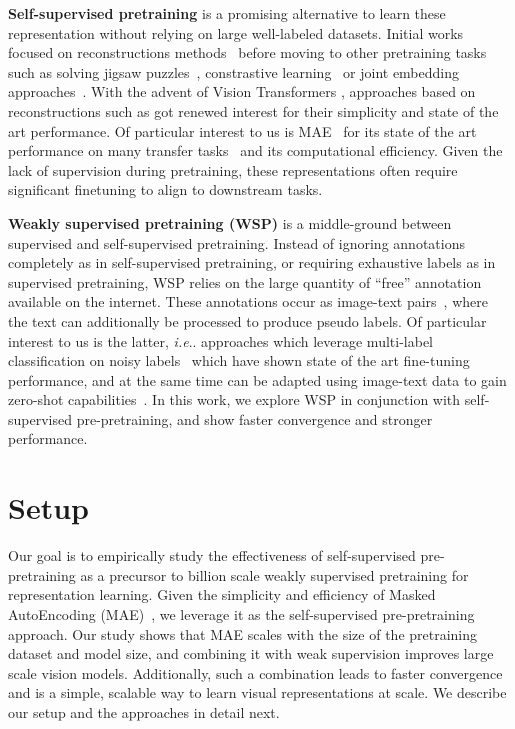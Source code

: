 \documentclass[10pt,twocolumn,letterpaper]{article}
\makeatletter
\DeclareRobustCommand\onedot{\futurelet\@let@token\@onedot}
\def\@onedot{\ifx\@let@token.\else.\null\fi\xspace}
\def\ie{\emph{i.e}\onedot} \def\Ie{\emph{I.e}\onedot}
\newcommand{\prept}{pre-pretraining\xspace}
\newcommand{\ce}{WSP\xspace}
\makeatother
\begin{document}
{\noindent \bf Self-supervised pretraining} is a promising alternative to learn these representation without relying on large well-labeled datasets.
Initial works focused on reconstructions methods~\cite{vincent2010stacked} before moving to other pretraining tasks
such as solving jigsaw puzzles~\cite{noroozi2016unsupervised},
constrastive learning~\cite{he2019moco,chen2020simple} or joint embedding
approaches~\cite{grill2020bootstrap,caron2020unsupervised,caron2021emerging, zhou2021ibot,assran2022masked,assran2023self}. With the advent of Vision Transformers \cite{dosovitskiy2020image}, approaches based on reconstructions such as \cite{bao2021beit,xie2021simmim,he2021masked} got renewed interest for their simplicity and state of the art performance.
Of particular interest to us is MAE~\cite{he2021masked} for its state of the art performance on many transfer tasks~\cite{he2021masked,li2022exploring,girdhar2023omnimae,tong2022videomae,feichtenhofer2022masked} and its computational efficiency.
Given the lack of supervision during pretraining, these representations often require significant finetuning to align to downstream tasks.

{\bf \noindent Weakly supervised pretraining (\ce)} is a middle-ground between supervised and self-supervised pretraining. Instead of ignoring annotations completely as in self-supervised pretraining, or requiring exhaustive labels as in supervised pretraining, \ce
relies on the large quantity of ``free'' annotation available on the internet. These annotations occur as image-text
pairs~\cite{radford2021learning,schuhmann2022laion}, where the text can additionally be processed to produce pseudo labels. Of particular interest to us is the latter, \ie
approaches which leverage multi-label classification on noisy labels~\cite{zhai2022scaling,mahajan2018exploring,singh2022revisiting,ghadiyaram2019large}
which have shown state of the art fine-tuning performance, and at the same time can be adapted using image-text data
to gain zero-shot capabilities~\cite{zhai2022lit}.
In this work, we explore \ce in conjunction with self-supervised \prept, and show faster convergence and stronger performance.


 \section{Setup}

Our goal is to empirically study the effectiveness of self-supervised pre-pretraining as a precursor to billion scale weakly supervised pretraining for representation learning.
Given the simplicity and efficiency of Masked AutoEncoding (MAE)~\cite{he2021masked},
we leverage it as the self-supervised pre-pretraining approach. Our study shows that MAE scales with the size of the pretraining dataset and model size, and combining it with weak supervision improves large scale vision models.
Additionally, such a combination leads to faster convergence and is a simple, scalable way to learn visual representations at scale.
We describe our setup and the approaches in detail next.
\end{document}
